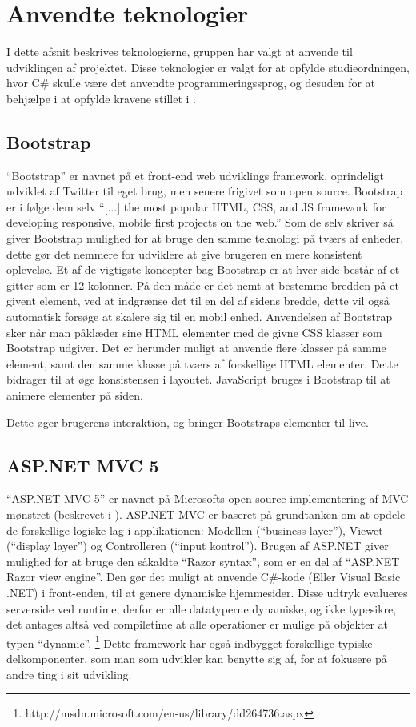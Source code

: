 \section{Anvendte teknologier}
I dette afsnit beskrives teknologierne, gruppen har valgt at anvende til udviklingen af projektet.
Disse teknologier er valgt for at opfylde studieordningen, hvor C\# skulle være det anvendte programmeringssprog, og desuden for at behjælpe i at opfylde kravene stillet i .

\subsection{Bootstrap}
``Bootstrap'' er navnet på et front-end web udviklings framework, oprindeligt udviklet af Twitter til eget brug, men senere frigivet som open source.
Bootstrap er i følge dem selv ``[...] the most popular HTML, CSS, and JS framework for developing responsive, mobile first projects on the web.'' \cite{GETBOOTSTRAP}
Som de selv skriver så giver Bootstrap mulighed for at bruge den samme teknologi på tværs af enheder, dette gør det nemmere for udviklere at give brugeren en mere konsistent oplevelse.
Et af de vigtigste koncepter bag Bootstrap er at hver side består af et gitter som er 12 kolonner.
På den måde er det nemt at bestemme bredden på et givent element, ved at indgrænse det til en del af sidens bredde, dette vil også automatisk forsøge at skalere sig til en mobil enhed.
Anvendelsen af Bootstrap sker når man påklæder sine HTML elementer med de givne CSS klasser som Bootstrap udgiver.
Det er herunder muligt at anvende flere klasser på samme element, samt den samme klasse på tværs af forskellige HTML elementer.
Dette bidrager til at øge konsistensen i layoutet.
JavaScript bruges i Bootstrap til at animere elementer på siden.

Dette øger brugerens interaktion, og bringer Bootstraps elementer til live. \cite{GETBOOTSTRAP}

\subsection{ASP.NET MVC 5}\label{aspnet}
``ASP.NET MVC 5'' er navnet på Microsofts open source implementering af MVC mønstret (beskrevet i ).
ASP.NET MVC er baseret på grundtanken om at opdele de forskellige logiske lag i applikationen: Modellen (``business layer''), Viewet (``display layer'') og Controlleren (``input kontrol'').
Brugen af ASP.NET giver mulighed for at bruge den såkaldte ``Razor syntax'', som er en del af ``ASP.NET Razor view engine''.
Den gør det muligt at anvende C\#-kode (Eller Visual Basic .NET) i front-enden, til at genere dynamiske hjemmesider.
Disse udtryk evalueres serverside ved runtime, derfor er alle datatyperne dynamiske, og ikke typesikre, det antages altså ved compiletime at alle operationer er mulige på objekter at typen ``dynamic''. \footnote{http://msdn.microsoft.com/en-us/library/dd264736.aspx}
Dette framework har også indbygget forskellige typiske delkomponenter, som man som udvikler kan benytte sig af, for at fokusere på andre ting i sit udvikling.

